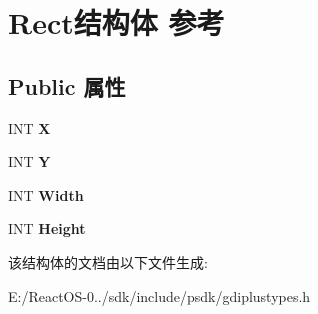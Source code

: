 \hypertarget{struct_rect}{}\section{Rect结构体 参考}
\label{struct_rect}
\subsection*{Public 属性}
\begin{DoxyCompactItemize}
\item 
\mbox{\label{struct_rect_aceef80c808379320a8ef1d29654bbeeb}} 
I\+NT {\bfseries X}
\item 
\mbox{\label{struct_rect_ad56da46125642d636e8ecfdaffd43a2d}} 
I\+NT {\bfseries Y}
\item 
\mbox{\label{struct_rect_a465115bde8b1eee76082a842b8e2c4ec}} 
I\+NT {\bfseries Width}
\item 
\mbox{\label{struct_rect_a881492f7b2c7b622e6f12139b3c1a2ec}} 
I\+NT {\bfseries Height}
\end{DoxyCompactItemize}


该结构体的文档由以下文件生成\+:\begin{DoxyCompactItemize}
\item 
E\+:/\+React\+O\+S-\/0../sdk/include/psdk/gdiplustypes.\+h\end{DoxyCompactItemize}

